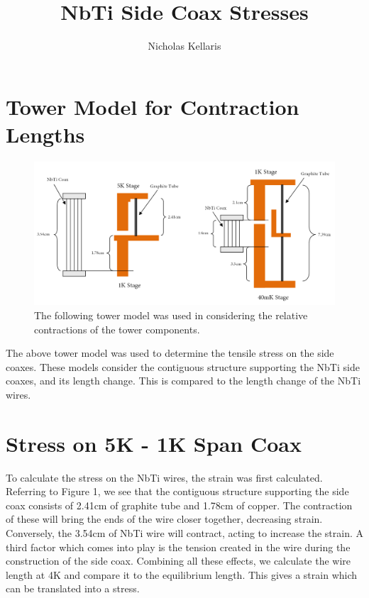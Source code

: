 \documentclass{article}
\title{NbTi Side Coax Stresses}
\author{Nicholas Kellaris}
\begin{document}

\maketitle

\section{Tower Model for Contraction Lengths}

\begin{figure}[h]
\includegraphics[width = \textwidth]{Contraction_diagram.png}
\caption{The following tower model was used in considering the relative contractions of the tower components.}
\end{figure}

The above tower model was used to determine the tensile stress on the side coaxes. These models consider the contiguous structure supporting the NbTi side coaxes, and its length change. This is compared to the length change of the NbTi wires.

\section{Stress on 5K - 1K Span Coax}

To calculate the stress on the NbTi wires, the strain was first calculated. Referring to Figure 1, we see that the contiguous structure supporting the side coax consists of 2.41cm of graphite tube and 1.78cm of copper. The contraction of these will bring the ends of the wire closer together, decreasing strain. Conversely, the 3.54cm of NbTi wire will contract, acting to increase the strain. A third factor which comes into play is the tension created in the wire during the construction of the side coax. Combining all these effects, we calculate the wire length at 4K and compare it to the equilibrium length. This gives a strain which can be translated into a stress.
\end{document}
